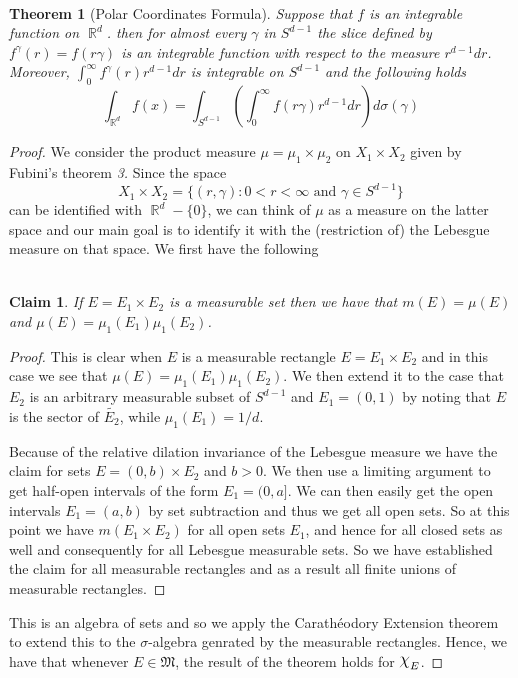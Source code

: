 \documentclass{article}
\DeclareMathOperator{\R}{\mathbb{R}}
\DeclareMathOperator{\capchi}{\raisebox{2pt}{$\mathlarger{\mathlarger{\chi}}$}}
\DeclareMathOperator{\suchthat}{\mathrel{:}}
\newtheorem*{thm}{\\ Theorem}
\newtheorem*{claim}{\\ Claim}
\begin{document}
\begin{thm}[Polar Coordinates Formula]
  Suppose that $f$ is an integrable function on $\R^d$. then for
  almost every $\gamma$ in $S^{d-1}$ the slice defined by $f^\gamma(r)
  = f(r\gamma)$ is an integrable function with respect to the measure
  $r^{d-1}dr$. Moreover, $\int_0^\infty f^\gamma(r)r^{d-1}dr$ is
  integrable on $S^{d-1}$ and the following holds
  \[
  \int_{\R^d}f(x) = \int_{S^{d-1}}\left(\int_0^\infty
    f(r\gamma)r^{d-1}dr\right)d\sigma(\gamma)
  \]
\end{thm}
\begin{proof}
  We consider the product measure $\mu = \mu_1 \times \mu_2$ on $X_1
  \times X_2$ given by Fubini's theorem \textit{3.} Since the space
  \[
  X_1 \times X_2 = \{(r,\gamma) \suchthat 0<r<\infty \text{ and
  }\gamma\in S^{d-1}\}
  \]
  can be identified with $\R^d - \{0\}$, we can think of $\mu$ as a
  measure on the latter space and our main goal is to identify it with
  the (restriction of) the Lebesgue measure on that space. We first
  have the following
  \begin{claim}
    If $E = E_1 \times E_2$ is a measurable set then we have
    that $m(E) = \mu(E)$ and $\mu(E) = \mu_1(E_1)\mu_1(E_2)$.
  \end{claim}
  \begin{proof}
    This is clear when $E$ is a measurable rectangle $E = E_1 \times
    E_2$ and in this case we see that $\mu(E) =
    \mu_1(E_1)\mu_1(E_2)$. We then extend it to the case that $E_2$ is
    an arbitrary measurable subset of $S^{d-1}$ and $E_1 = (0,1)$ by
    noting that $E$ is the sector of $\tilde{E_2}$, while $\mu_1(E_1) = 1/d$.

    Because of the relative dilation invariance of the Lebesgue
    measure we have the claim for sets $E = (0,b) \times E_2$ and $b >
    0$. We then use a limiting argument to get half-open intervals of
    the form $E_1 = (0, a]$. We can then easily get the open intervals
    $E_1 = (a,b)$ by set subtraction and thus we get all open sets. So
    at this point we have $m(E_1 \times E_2)$ for all open sets $E_1$,
    and hence for all closed sets as well and consequently for all
    Lebesgue measurable sets. So we have established the claim for all
    measurable rectangles and as a result all finite unions of
    measurable rectangles.
  \end{proof}
  This is an algebra of sets and so we apply the Carath\'{e}odory
  Extension theorem to extend this to the $\sigma$-algebra genrated by
  the measurable rectangles. Hence, we have that whenever $E \in
  \mathfrak{M}$, the result of the theorem holds for $\capchi_E$.


\end{proof}
\end{document}
